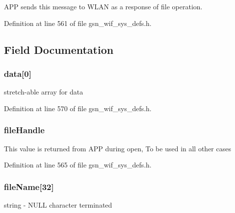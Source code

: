 APP sends this message to WLAN as a response of file operation. 

Definition at line 561 of file gsn\_\-wif\_\-sys\_\-defs.h.



\subsection{Field Documentation}
\hypertarget{a00351_a29500e452cff835f2b70d1dff36f918a}{
\subsubsection[{data}]{ {\bf data}\mbox{[}0\mbox{]}}}
\label{a00351_a29500e452cff835f2b70d1dff36f918a}
stretch-\/able array for data 

Definition at line 570 of file gsn\_\-wif\_\-sys\_\-defs.h.

\hypertarget{a00351_a31636a2d20d4a83f03ddba7c789cb00a}{
\subsubsection[{fileHandle}]{ {\bf fileHandle}}}
\label{a00351_a31636a2d20d4a83f03ddba7c789cb00a}
This value is returned from APP during open, To be used in all other cases 

Definition at line 565 of file gsn\_\-wif\_\-sys\_\-defs.h.

\hypertarget{a00351_a44211bff423210b4e239a8616f8bbd33}{
\subsubsection[{fileName}]{ {\bf fileName}\mbox{[}32\mbox{]}}}
\label{a00351_a44211bff423210b4e239a8616f8bbd33}
string -\/ NULL character terminated 

